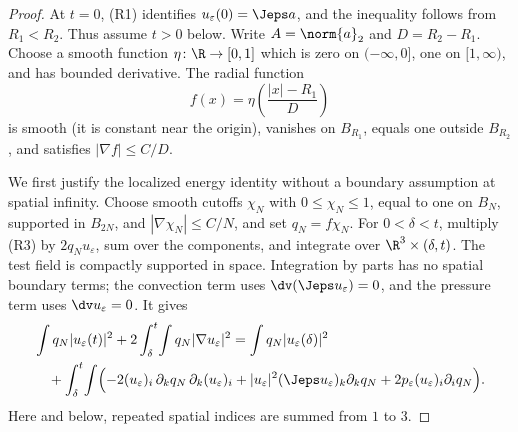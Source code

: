 \documentclass[11pt,reqno]{amsart}
\begin{document}
\begin{proof}
At $t=0$, (R1) identifies $u_\varepsilon(0)=\Jeps a$, and the inequality
follows from $R_1<R_2$. Thus assume $t>0$ below.
Write $A=\norm{a}_2$ and $D=R_2-R_1$. Choose a smooth function
$\eta\colon\R\to[0,1]$ which is zero on $(-\infty,0]$, one on $[1,\infty)$,
and has bounded derivative. The radial function
\[
  f(x)=\eta\!\left(\frac{|x|-R_1}{D}\right)
\]
is smooth (it is constant near the origin), vanishes on $B_{R_1}$, equals one
outside $B_{R_2}$, and satisfies $|\nabla f|\leq C/D$.

We first justify the localized energy identity without a boundary assumption
at spatial infinity. Choose smooth cutoffs $\chi_N$ with $0\leq\chi_N\leq1$,
equal to one on $B_N$, supported in $B_{2N}$, and
$|\nabla\chi_N|\leq C/N$, and set $q_N=f\chi_N$. For $0<\delta<t$, multiply
(R3) by $2q_Nu_\varepsilon$, sum over the components, and integrate over
$\R^3\times(\delta,t)$. The test field is compactly supported in space.
Integration by parts has no spatial boundary terms; the convection term uses
$\dv(\Jeps u_\varepsilon)=0$, and the pressure term uses
$\dv u_\varepsilon=0$. It gives
\begin{align*}
  &\int q_N|u_\varepsilon(t)|^2
       +2\int_\delta^t\!\int q_N|\nabla u_\varepsilon|^2
   =\int q_N|u_\varepsilon(\delta)|^2\\
  &\quad+\int_\delta^t\!\int\Bigl(
       -2(u_\varepsilon)_i\,\partial_kq_N\,
                           \partial_k(u_\varepsilon)_i
       +|u_\varepsilon|^2(\Jeps u_\varepsilon)_k\partial_kq_N
       +2p_\varepsilon(u_\varepsilon)_i\partial_iq_N\Bigr).
\end{align*}
Here and below, repeated spatial indices are summed from $1$ to $3$.


\end{proof}
\end{document}
